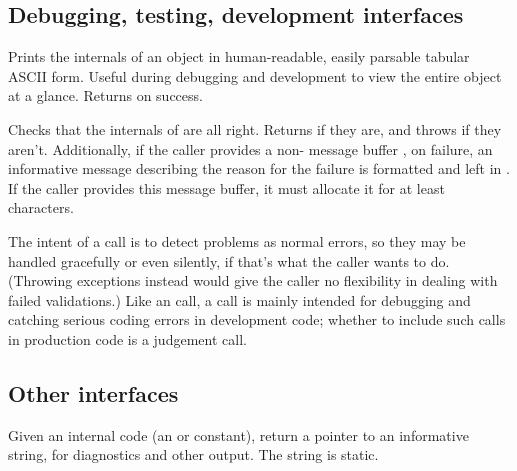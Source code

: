 \subsection{Debugging, testing, development interfaces}

\begin{sreapi}
\hypertarget{ifc:Dump}
{\item[\ccode{\_Dump*(FILE *fp, obj...)}]}

Prints the internals of an object in human-readable, easily parsable
tabular ASCII form. Useful during debugging and development to view
the entire object at a glance. Returns  on success.

\hypertarget{ifc:Validate}
{\item[\ccode{\_Validate*(obj, errbuf...)}]}

Checks that the internals of  are all right. Returns
 if they are, and throws  if they
aren't. Additionally, if the caller provides a non-
message buffer , on failure, an informative message
describing the reason for the failure is formatted and left in
. If the caller provides this message buffer, it must
allocate it for at least  characters.

The intent of a  call is to detect problems as
normal errors, so they may be handled gracefully or even silently, if
that's what the caller wants to do. (Throwing exceptions instead would
give the caller no flexibility in dealing with failed validations.)
Like an  call, a  call is mainly
intended for debugging and catching serious coding errors in
development code; whether to include such calls in production code is
a judgement call.

\end{sreapi}



\subsection{Other interfaces}

\begin{sreapi}
\hypertarget{ifc:Describe}
{\item[\ccode{\_DescribeXXX()}]}

Given an internal code (an  or  constant),
return a pointer to an informative string, for diagnostics and other
output. The string is static.
\end{sreapi}


